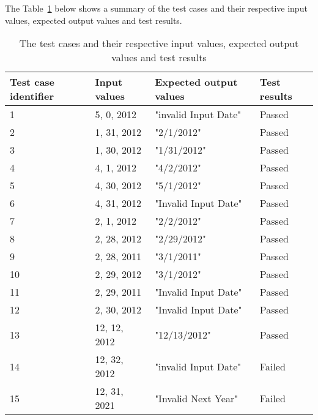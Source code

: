 
\noindent The Table~\ref{testinputtable} below shows a summary of the test cases and their respective input values, expected output values and test results. 

\begin{table}[!htb]
	\centering
	\caption{The test cases and their respective input values, expected output values and test results}
	\label{testinputtable}	
    \begin{tabular}{|l|l|l|l|}
        \hline
        Test case identifier & Input values & Expected output values &  Test results \\ \hline
        1                    & 5, 0, 2012   & "invalid Input Date"   &  Passed       \\ 
        2                    & 1, 31, 2012  & "2/1/2012"             &  Passed       \\ 
        3                    & 1, 30, 2012  & "1/31/2012"            &  Passed       \\ 
        4                    & 4, 1, 2012   & "4/2/2012"             &  Passed       \\ 
        5                    & 4, 30, 2012  & "5/1/2012"             &  Passed       \\ 
        6                    & 4, 31, 2012  & "Invalid Input Date"   &  Passed       \\ 
        7                    & 2, 1, 2012   & "2/2/2012"             &  Passed       \\ 
        8                    & 2, 28, 2012  & "2/29/2012"            &  Passed       \\ 
        9                    & 2, 28, 2011  & "3/1/2011"             &  Passed       \\ 
        10                   & 2, 29, 2012  & "3/1/2012"             &  Passed       \\ 
        11                   & 2, 29, 2011  & "Invalid Input Date"   &  Passed       \\ 
        12                   & 2, 30, 2012  & "Invalid Input Date"   &  Passed       \\ 
        13                   & 12, 12, 2012 & "12/13/2012"           &  Passed       \\ 
        14                   & 12, 32, 2012 & "invalid Input Date"   &  Failed       \\ 
        15                   & 12, 31, 2021 & "Invalid Next Year"    &  Failed       \\ 

\end{tabular}
\end{table}
